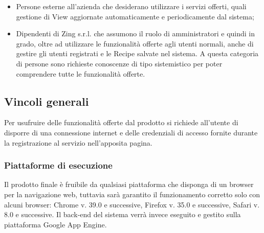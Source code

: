 \begin{itemize}
\item Persone esterne all'azienda che desiderano utilizzare i servizi offerti, quali gestione di View\gloss{} aggiornate automaticamente e periodicamente dal sistema;
\item Dipendenti di Zing s.r.l. che assumono il ruolo di amministratori e quindi in grado, oltre ad utilizzare le funzionalità offerte agli utenti normali, anche di gestire gli utenti registrati e le Recipe\gloss{} salvate nel sistema.
A questa categoria di persone sono richieste conoscenze di tipo sistemistico per poter comprendere tutte le funzionalità offerte.
\end{itemize}


\subsection{Vincoli generali}
Per usufruire delle funzionalità offerte dal prodotto si richiede all'utente di disporre
di una connessione internet e delle credenziali di accesso fornite durante la registrazione al servizio nell'apposita pagina.

\subsubsection{Piattaforme di esecuzione}
Il prodotto finale è fruibile da qualsiasi piattaforma che disponga di un browser per la navigazione web, tuttavia sarà garantito il funzionamento corretto solo con alcuni browser: Chrome v. 39.0 e successive, Firefox v. 35.0 e successive, Safari v. 8.0 e successive.
Il back-end del sistema verrà invece eseguito e gestito sulla piattaforma Google App Engine\gloss{}.
